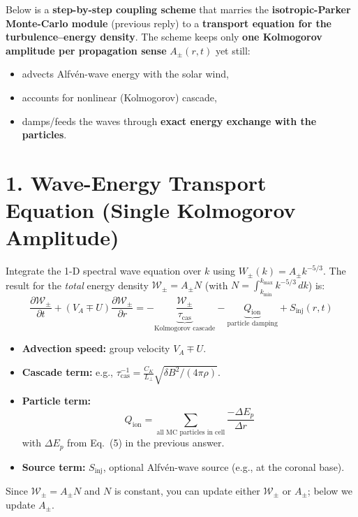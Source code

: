 \begin{tcolorbox}[colframe=black, colback=white, title=Step-by-Step Coupling Scheme]

Below is a \textbf{step-by-step coupling scheme} that marries the \textbf{isotropic-Parker Monte-Carlo module} (previous reply) to a \textbf{transport equation for the turbulence–energy density}. The scheme keeps only \textbf{one Kolmogorov amplitude per propagation sense} \( A_\pm(r, t) \) yet still:
\begin{itemize}
    \item advects Alfvén-wave energy with the solar wind,
    \item accounts for nonlinear (Kolmogorov) cascade,
    \item damps/feeds the waves through \textbf{exact energy exchange with the particles}.
\end{itemize}

\section*{1. Wave-Energy Transport Equation (Single Kolmogorov Amplitude)}

Integrate the 1-D spectral wave equation over \( k \) using \( W_\pm(k) = A_\pm k^{-5/3} \). The result for the \emph{total} energy density \( \mathcal{W}_\pm = A_\pm N \) (with \( N = \int_{k_{\min}}^{k_{\max}} k^{-5/3} \, dk \)) is:
\[
\boxed{
\frac{\partial \mathcal{W}_\pm}{\partial t}
+ (V_A \mp U) \frac{\partial \mathcal{W}_\pm}{\partial r}
= - \underbrace{\frac{\mathcal{W}_\pm}{\tau_{\text{cas}}}}_{\text{Kolmogorov cascade}}
- \underbrace{Q_{\text{ion}}}_{\text{particle damping}}
+ S_{\text{inj}}(r, t)
}
\tag{1}
\]
\begin{itemize}
    \item \textbf{Advection speed:} group velocity \( V_A \mp U \).
    \item \textbf{Cascade term:} e.g., \( \tau_{\text{cas}}^{-1} = \frac{C_K}{L_\perp} \sqrt{ \delta B^2 / (4 \pi \rho) } \).
    \item \textbf{Particle term:} 
    \[
    Q_{\text{ion}} = \sum_{\text{all MC particles in cell}} \frac{-\Delta E_p}{\Delta r}
    \]
    with \( \Delta E_p \) from Eq.~(5) in the previous answer.
    \item \textbf{Source term:} \( S_{\text{inj}} \), optional Alfvén-wave source (e.g., at the coronal base).
\end{itemize}
Since \( \mathcal{W}_\pm = A_\pm N \) and \( N \) is constant, you can update either \( \mathcal{W}_\pm \) or \( A_\pm \); below we update \( A_\pm \).

\end{tcolorbox}

